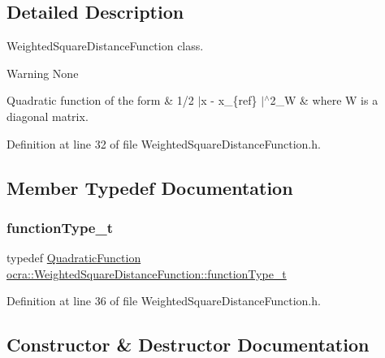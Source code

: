 \subsection{Detailed Description}
Weighted\+Square\+Distance\+Function class. 

\begin{DoxyWarning}{Warning}
None
\end{DoxyWarning}
Quadratic function of the form \& 1/2 $|$x -\/ x\+\_\+\{ref\} $|$$^\wedge$2\+\_\+W \& where W is a diagonal matrix. 

Definition at line 32 of file Weighted\+Square\+Distance\+Function.\+h.



\subsection{Member Typedef Documentation}
\hypertarget{classocra_1_1WeightedSquareDistanceFunction_ab8fcee2e8ec81e8790f3d00b1d541d9a}{}\label{classocra_1_1WeightedSquareDistanceFunction_ab8fcee2e8ec81e8790f3d00b1d541d9a} 
\subsubsection{\texorpdfstring{function\+Type\+\_\+t}{functionType\_t}}
{\footnotesize\ttfamily typedef \hyperlink{classocra_1_1QuadraticFunction}{Quadratic\+Function} \hyperlink{classocra_1_1WeightedSquareDistanceFunction_ab8fcee2e8ec81e8790f3d00b1d541d9a}{ocra\+::\+Weighted\+Square\+Distance\+Function\+::function\+Type\+\_\+t}}



Definition at line 36 of file Weighted\+Square\+Distance\+Function.\+h.



\subsection{Constructor \& Destructor Documentation}
\hypertarget{classocra_1_1WeightedSquareDistanceFunction_a25942322441c7bac8adb24d8f1d27905}{}\label{classocra_1_1WeightedSquareDistanceFunction_a25942322441c7bac8adb24d8f1d27905} 
